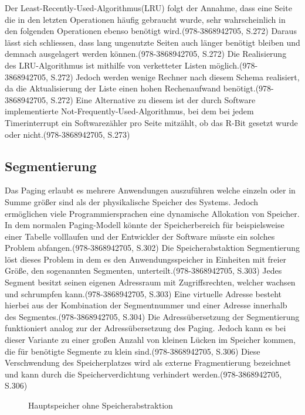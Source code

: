 Der Least-Recently-Used-Algorithmus(LRU) folgt der Annahme, dass eine Seite die in den letzten Operationen häufig gebraucht wurde, sehr wahrscheinlich in den folgenden Operationen ebenso benötigt wird.(978-3868942705, S.272) Daraus lässt sich schliessen, dass lang ungenutzte Seiten auch länger benötigt bleiben und demnach ausgelagert werden können.(978-3868942705, S.272) Die Realisierung des LRU-Algorithmus ist mithilfe von verketteter Listen möglich.(978-3868942705, S.272) Jedoch werden wenige Rechner nach diesem Schema realisiert, da die Aktualisierung der Liste einen hohen Rechenaufwand benötigt.(978-3868942705, S.272) Eine Alternative zu diesem ist der durch Software implementierte Not-Frequently-Used-Algorithmus, bei dem bei jedem Timerinterrupt ein Softwarezähler pro Seite mitzählt, ob das R-Bit gesetzt wurde oder nicht.(978-3868942705, S.273)

\subsection{Segmentierung}
Das Paging erlaubt es mehrere Anwendungen auszuführen welche einzeln oder in Summe  größer sind als der physikalische Speicher des Systems. Jedoch ermöglichen viele Programmiersprachen eine dynamische Allokation von Speicher. In dem normalen Paging-Modell könnte der Speicherbereich für beispielsweise einer Tabelle volllaufen und der Entwickler der Software müsste ein solches Problem abfangen.(978-3868942705, S.302) Die Speicherabstaktion Segmentierung löst dieses Problem in dem es den Anwendungsspeicher in Einheiten mit freier Größe, den sogenannten Segmenten, unterteilt.(978-3868942705, S.303)  Jedes Segment besitzt seinen eigenen Adressraum mit Zugriffsrechten, welcher wachsen und schrumpfen kann.(978-3868942705, S.303) Eine virtuelle Adresse besteht hierbei aus der Kombination der Segmentnummer und einer Adresse innerhalb des Segmentes.(978-3868942705, S.304) Die Adressübersetzung der Segmentierung funktioniert analog zur der Adressübersetzung des Paging. Jedoch kann es bei dieser Variante zu einer großen Anzahl von kleinen Lücken im Speicher kommen, die für benötigte Segmente zu klein sind.(978-3868942705, S.306) Diese Verschwendung des Speicherplatzes wird als externe Fragmentierung bezeichnet und kann durch die Speicherverdichtung verhindert werden.(978-3868942705, S.306)

\begin{figure}[htb]
	\centering
	\caption{Hauptspeicher ohne Speicherabstraktion}
\end{figure}

